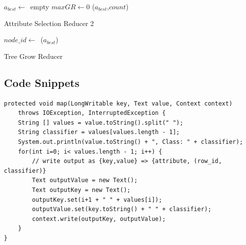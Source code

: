 \documentclass{article}
\begin{document}

\IncMargin{1em}
\begin{algorithm}[H]
\DontPrintSemicolon
{}
\BlankLine
$a_{best}\leftarrow$\ empty\;
$maxGR\leftarrow 0$\;
\emit(${a_{best}}$,$count$)
\caption{Attribute Selection Reducer 2\label{algo:atred_4}}
\end{algorithm}
\DecMargin{1em}



\IncMargin{1em}
\begin{algorithm}[H]
\DontPrintSemicolon
{}
\BlankLine
$node\_id\leftarrow$\ \hash(${a_{best}}$)\;
\caption{Tree Grow Reducer\label{algo:atred_5}}
\end{algorithm}
\DecMargin{1em}


\subsection{Code Snippets}


\begin{lstlisting}[caption={Attrib Table Mapper code snippet},label={lst:attrtblmap},style=MyJavaStyle]
protected void map(LongWritable key, Text value, Context context)
    throws IOException, InterruptedException {
    String [] values = value.toString().split(" ");
    String classifier = values[values.length - 1];
    System.out.println(value.toString() + ", Class: " + classifier);
    for(int i=0; i< values.length - 1; i++) {
        // write output as {key,value} => {attribute, (row_id, classifier)}
        Text outputValue = new Text();
        Text outputKey = new Text();
        outputKey.set(i+1 + " " + values[i]);
        outputValue.set(key.toString() + " " + classifier);
        context.write(outputKey, outputValue);
    }
}
\end{lstlisting}
\end{document}
